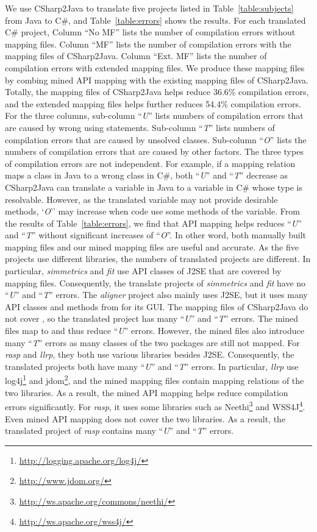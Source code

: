 We use CSharp2Java to translate five projects listed in
Table~\ref{table:subjects} from Java to C\#, and
Table~\ref{table:errors} shows the results. For each translated C\#
project, Column ``No MF'' lists the number of compilation errors
without mapping files. Column ``MF'' lists the number of compilation
errors with the mapping files of CSharp2Java. Column ``Ext. MF''
lists the number of compilation errors with extended mapping files.
We produce these mapping files by combing mined API mapping with the
existing mapping files of CSharp2Java. Totally, the mapping files of
CSharp2Java helps reduce 36.6\% compilation errors, and the extended
mapping files helps further reduces 54.4\% compilation errors. For
the three columns, sub-column ``\emph{U}'' lists numbers of
compilation errors that are caused by wrong using statements.
Sub-column ``\emph{T}'' lists numbers of compilation errors that are
caused by unsolved classes. Sub-column ``\emph{O}'' lists the
numbers of compilation errors that are caused by other factors. The
three types of compilation errors are not independent. For example,
if a mapping relation maps a class in Java to a wrong class in C\#,
both ``\emph{U}'' and ``\emph{T}'' decrease as CSharp2Java can
translate a variable in Java to a variable in C\# whose type is
resolvable. However, as the translated variable may not provide
desirable methods, `\emph{O}'' may increase when code use some
methods of the variable. From the results of
Table~\ref{table:errors}, we find that API mapping helps reduces
``\emph{U}'' and ``\emph{T}'' without significant increases of
``\emph{O}''. In other word, both manually built mapping files and
our mined mapping files are useful and accurate. As the five
projects use different libraries, the numbers of translated projects
are different. In particular, \emph{simmetrics} and \emph{fit} use
API classes of J2SE that are covered by mapping files. Consequently,
the translate projects of \emph{simmetrics} and \emph{fit} have no
``\emph{U}'' and ``\emph{T}'' errors. The \emph{aligner} project
also mainly uses J2SE, but it uses many API classes and methods from
 for its GUI. The mapping files of CSharp2Java do
not cover , so the translated project has many
``\emph{U}'' and ``\emph{T}'' errors. The mined files map
 to  and thus reduce
``\emph{U}'' errors. However, the mined files also introduce many
``\emph{T}'' errors as many classes of the two packages are still
not mapped. For \emph{rasp} and \emph{llrp}, they both use various
libraries besides J2SE. Consequently, the translated projects both
have many ``\emph{U}'' and ``\emph{T}'' errors. In particular,
\emph{llrp} use
log4j\footnote{\url{http://logging.apache.org/log4j/}} and
jdom\footnote{\url{http://www.jdom.org/}}, and the mined mapping
files contain mapping relations of the two libraries. As a result,
the mined API mapping helps reduce compilation errors significantly.
For \emph{rasp}, it uses some libraries such as
Neethi\footnote{\url{http://ws.apache.org/commons/neethi/}} and
WSS4J\footnote{\url{http://ws.apache.org/wss4j/}}. Even mined API
mapping does not cover the two libraries. As a result, the
translated project of \emph{rasp} contains many ``\emph{U}'' and
``\emph{T}'' errors.

